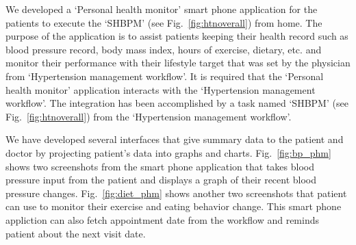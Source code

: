 \documentclass[a4paper]{llncs}
\begin{document}
We developed a `Personal health monitor' smart phone application for the patients to execute the `SHBPM' (see Fig.~\ref{fig:htnoverall}) from home. 
The purpose of the application is to assist patients keeping their health record such as blood pressure record, body mass index, hours of exercise, dietary, etc. 
and monitor their performance with their lifestyle target that was set by the physician from `Hypertension management workflow'. 
It is required that the `Personal health monitor' application interacts with the `Hypertension management workflow'. 
The integration has been accomplished by a task named `SHBPM' (see Fig.~\ref{fig:htnoverall}) from the `Hypertension management workflow'. 

We have developed several interfaces that give summary data to the patient and doctor by projecting patient's data into graphs and charts. 
Fig.~\ref{fig:bp_phm} shows two screenshots from the smart phone application that takes blood pressure input from the patient and displays a graph of their recent blood pressure changes. 
Fig.~\ref{fig:diet_phm} shows another two screenshots that patient can use to monitor their exercise and eating behavior change. 
This smart phone appliction can also fetch appointment date from the workflow and reminds patient about the next visit date. 














\end{document}
